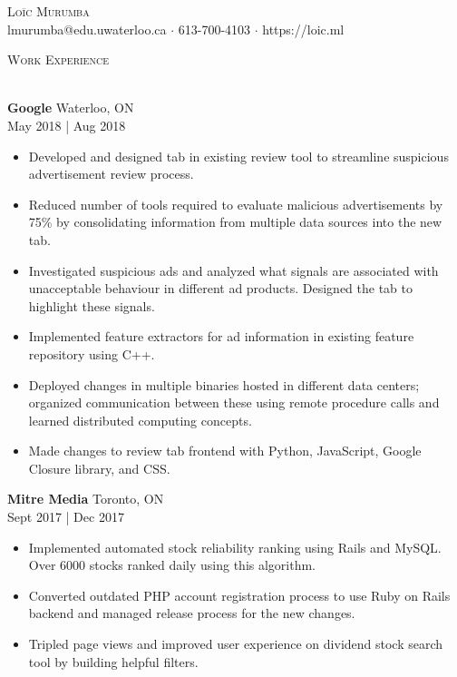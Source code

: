 \documentclass[a4paper]{article}
\newcommand{\lineunder} {
    \vspace*{-8pt} \\
    \hspace*{-18pt} \hrulefill \\
}
\newcommand{\header} [1] {
    {\hspace*{-18pt}\vspace*{6pt} \textsc{#1}}
    \vspace*{-6pt} \lineunder
}
\begin{document}
\vspace*{-40pt}

    

\vspace*{-10pt}
\begin{center}
	{\Huge \scshape {Loïc Murumba}}\\
	lmurumba@edu.uwaterloo.ca $\cdot$ 613-700-4103 $\cdot$ https://loic.ml\\
\end{center}

\header{Work Experience}
\vspace{1mm}

\textbf{Google} \hfill Waterloo, ON\\
 \hfill May 2018 | Aug 2018\\
\vspace{-1mm}
\begin{itemize} \itemsep 1pt
	\item Developed and designed tab in existing review tool to streamline suspicious advertisement review process.
    	\item Reduced number of tools required to evaluate malicious advertisements by 75\% by consolidating information from multiple data sources into the new tab.
    \item Investigated suspicious ads and analyzed what signals are associated with unacceptable behaviour in different ad products. Designed the tab to highlight these signals.
	\item Implemented feature extractors for ad information in existing feature repository using C++.
	\item Deployed changes in multiple binaries hosted in different data centers; organized communication between these using remote procedure calls and learned distributed computing concepts.
	\item Made changes to review tab frontend with Python, JavaScript, Google Closure library, and CSS.

\end{itemize}

\textbf{Mitre Media} \hfill Toronto, ON\\
 \hfill Sept 2017 | Dec 2017\\
\vspace{-1mm}
\begin{itemize} \itemsep 1pt
	\item Implemented automated stock reliability ranking using Rails and MySQL. Over 6000 stocks ranked daily using this algorithm.
	\item Converted outdated PHP account registration process to use Ruby on Rails backend and managed release process for the new changes.
	\item Tripled page views and improved user experience on dividend stock search tool by building helpful filters.
\end{itemize}
\end{document}
